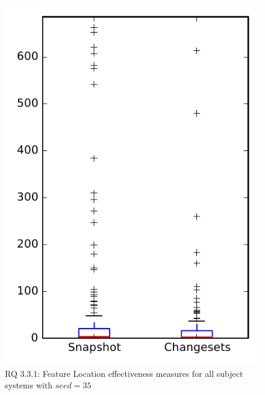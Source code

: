 
\begin{figure}
\centering
\includegraphics[height=0.4\textheight]{figures/flt_seed/rq1_overview_35}
\caption{RQ 3.3.1: Feature Location effectiveness measures for all subject systems with $seed=35$}
\label{fig:flt_seed:rq1:overview}
\end{figure}

